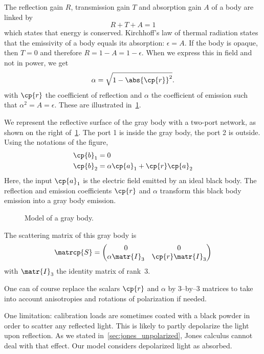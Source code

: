 \begin{refsection}
The reflection gain $R$, transmission gain $T$ and absorption gain $A$ of a body are linked by
\begin{equation}
    R + T + A = 1
\end{equation}
which states that energy is conserved.
Kirchhoff's law of thermal radiation states that the emissivity of a body equals its absorption: $\epsilon = A$.
If the body is opaque, then $T=0$ and therefore $R=1-A=1-\epsilon$.
When we express this in field and not in power, we get
\begin{equation}
    \alpha = \sqrt{ 1 - \abs{\cp{r}}^2 } \text{.}
\end{equation}
with $\cp{r}$ the coefficient of reflection and $\alpha$ the coefficient of emission such that $\alpha^2=A=\epsilon$.
These are illustrated in~\cref{fig:gray_body}.

We represent the reflective surface of the gray body with a two-port network, as shown on the right of~\cref{fig:gray_body}.
The port 1 is inside the gray body, the port 2 is outside.
Using the notations of the figure,
\begin{align}
    \cp{b}_1 &= 0 \\
    \cp{b}_2 &= \alpha \cp{a}_1 + \cp{r} \cp{a}_2
\end{align}
Here, the input $\cp{a}_1$ is the electric field emitted by an ideal black body.
The reflection and emission coefficients $\cp{r}$ and $\alpha$ transform this black body emission into a gray body emission.

\begin{figure}
    \centering
    
    \caption{Model of a gray body.}
    \label{fig:gray_body}
\end{figure}

The scattering matrix of this gray body is
\begin{equation}
    \matrcp{S} =
    \begin{pmatrix}
        0 & 0 \\
        \alpha \matr{I}_3 & \cp{r} \matr{I}_3
    \end{pmatrix}
\end{equation}
with $\matr{I}_3$ the identity matrix of rank~3.

One can of course replace the scalars $\cp{r}$ and $\alpha$ by 3--by--3 matrices to take into account anisotropies and rotations of polarization if needed.

One limitation: calibration loads are sometimes coated with a black powder in order to scatter any reflected light.
This is likely to partly depolarize the light upon reflection.
As we stated in~\cref{sec:jones_unpolarized}, Jones calculus cannot deal with that effect.
Our model considers depolarized light as absorbed.


\end{refsection}
